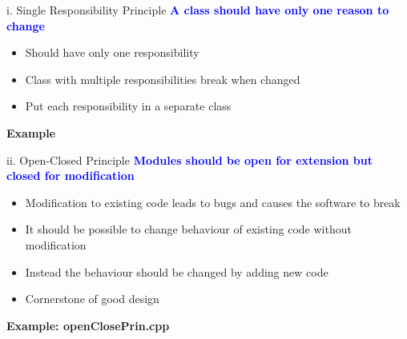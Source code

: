 \documentclass[13pt]{beamer}
\begin{document}
\begin{frame}{i. Single Responsibility Principle}
	\textcolor{blue}{\textbf{A class should have only one reason to change}}
	\begin{itemize}
		\item Should have only one responsibility
		\item Class with multiple responsibilities break when changed
		\item Put each responsibility in a separate class
	\end{itemize}
	\textbf{Example}                                        
	\begin{center}
	\end{center}
\end{frame}

\begin{frame}{ii. Open-Closed Principle}
	\textcolor{blue}{\textbf{Modules should be open for extension but closed for modification}}
	\begin{itemize}
		\item Modification to existing code leads to bugs and causes the software to break
		\item It should be possible to change behaviour of existing code without modification
		\item Instead the behaviour should be changed by adding new code
		\item Cornerstone of good design
	\end{itemize}            
	\textbf{Example: openClosePrin.cpp}
\end{frame}
\end{document}
